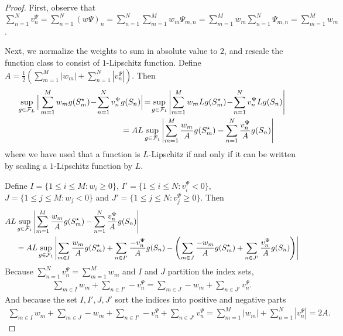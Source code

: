 \begin{proof}
First, observe that $\sum_{n=1}^N v_n^{\Psi} = \sum_{n=1}^N (w\Psi)_n = \sum_{n=1}^N \sum_{m=1}^M w_m\Psi_{m,n} = \sum_{m=1}^M w_m \sum_{n=1}^N  \Psi_{m,n} = \sum_{m=1}^M w_m$. 

Next, we normalize the weights to sum in absolute value to $2$, and rescale the function class to consist of $1$-Lipschitz function. Define $A = \frac{1}{2}\left(\sum_{m=1}^M |w_m| + \sum_{n=1}^N |v_n^{\Psi}|\right)$. Then
\begin{align}
     \sup_{g \in \mathcal{F}_{L}} \Big \vert \sum_{m=1}^M w_m g(S^{\star}_m) \! - \! \sum_{n=1}^N v_n^{\Psi} &g(S_n)\Big\vert 
       \!=\! \sup_{g \in \mathcal{F}_{1}} \left \vert \sum_{m=1}^M w_m Lg(S^{\star}_m) \!-\! \sum_{n=1}^N v_n^{\Psi} Lg(S_n)\right\vert \\
     & = AL \sup_{g \in \mathcal{F}_{1}} \left \vert \sum_{m=1}^M \frac{w_m}{A} g(S^{\star}_m) - \sum_{n=1}^N \frac{v_n^{\Psi}}{A} g(S_n)\right\vert 
\end{align}
where we have used that a function is $L$-Lipschitz if and only if it can be written by scaling a $1$-Lipschitz function by $L$.

Define $I = \{ 1 \leq i \leq M : w_i \geq 0\}$, $I' = \{1 \leq i \leq N: v_i^{\Psi} < 0\}$,  $J = \{ 1 \leq j \leq M : w_j < 0\}$ and $J' = \{1 \leq j \leq N : v_j^{\Psi} \geq 0\}$. Then 
\begin{align}
    AL &\sup_{g \in \mathcal{F}_{1}} \left \vert \sum_{m=1}^M \frac{w_m}{A} g(S^{\star}_m) - \sum_{n=1}^N \frac{v_n^{\Psi}}{A} g(S_n)\right\vert  \\ &= AL \sup_{g \in \mathcal{F}_{1}}\left \vert \sum_{m \in I} \frac{w_m}{A} g(S^{\star}_m)  + \sum_{n \in I'} \frac{-v_n^{\Psi}}{A} g(S_n) 
   - \left(\sum_{m \in J} \frac{-w_m}{A} g(S^{\star}_m)  + \sum_{n \in J'} \frac{v_n^{\Psi}}{A} g(S_n) \right)\right\vert 
\end{align}
Because $\sum_{n=1}^N v_n^{\Psi}=\sum_{m=1}^M w_m$ and $I$ and $J$ partition the index sets,
\begin{align}
    \sum_{m \in I} w_m + \sum_{n \in I'} -v_n^{\Psi} = \sum_{m \in J} -w_m  + \sum_{n \in J'} v_n^{\Psi}.
\end{align}
And because the set $I, I', J, J'$ sort the indices into positive and negative parts
\begin{align}
    \sum_{m \in I} w_m + \sum_{m \in J} -w_m + \sum_{n \in I'} -v_n^{\Psi} + \sum_{n \in J'} v_n^{\Psi} = \sum_{m=1}^M |w_m| + \sum_{n=1}^N |v_n^{\Psi}|=2A.
\end{align}


\end{proof}
